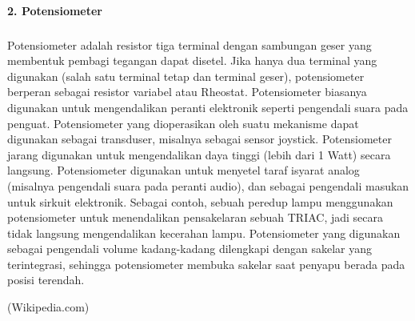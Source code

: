 \documentclass[12pt,a4paper]{article}
\begin{document}
\paragraph{ }
\textbf{2. Potensiometer}
\subparagraph{ }
	Potensiometer adalah resistor tiga terminal dengan sambungan geser yang membentuk pembagi tegangan dapat disetel. Jika hanya dua terminal yang digunakan (salah satu terminal tetap dan terminal geser), potensiometer berperan sebagai resistor variabel atau Rheostat. Potensiometer biasanya digunakan untuk mengendalikan peranti elektronik seperti pengendali suara pada penguat. Potensiometer yang dioperasikan oleh suatu mekanisme dapat digunakan sebagai transduser, misalnya sebagai sensor joystick. Potensiometer jarang digunakan untuk mengendalikan daya tinggi (lebih dari 1 Watt) secara langsung. Potensiometer digunakan untuk menyetel taraf isyarat analog (misalnya pengendali suara pada peranti audio), dan sebagai pengendali masukan untuk sirkuit elektronik. Sebagai contoh, sebuah peredup lampu menggunakan potensiometer untuk menendalikan pensakelaran sebuah TRIAC, jadi secara tidak langsung mengendalikan kecerahan lampu. Potensiometer yang digunakan sebagai pengendali volume kadang-kadang dilengkapi dengan sakelar yang terintegrasi, sehingga potensiometer membuka sakelar saat penyapu berada pada posisi terendah.
	
\begin{flushright}
(Wikipedia.com) 
\end{flushright}
	
\end{document}
